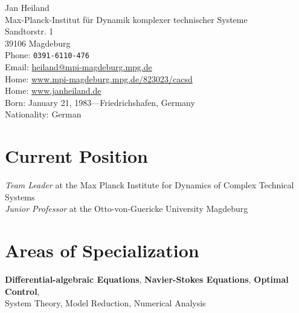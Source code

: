\documentclass[11pt, a4paper]{article} %
\begin{document}
\sffamily

{\LARGE Jan Heiland}\\[1cm] %
Max-Planck-Institut f\"ur Dynamik komplexer technischer Systeme\\ %
Sandtorstr. 1\\
39106 Magdeburg \\[.2cm]
Phone: \texttt{0391-6110-476}\\ [.2cm]
Email: \href{mailto:heiland@mpi-magdeburg.mpg.de}{heiland@mpi-magdeburg.mpg.de}\\ %
Home: \href{http://www.mpi-magdeburg.mpg.de/823023/cacsd}{www.mpi-magdeburg.mpg.de/823023/cacsd}\\ %
Home: \href{http://www.janheiland.de}{www.janheiland.de}\\[.3in] %



Born: January 21, 1983---Friedrichshafen, Germany\\ %
Nationality: German


\section*{Current Position}

\emph{Team Leader} at the Max Planck Institute for Dynamics of Complex Technical Systems \\ \emph{Junior Professor} at the Otto-von-Guericke University Magdeburg%


\section*{Areas of Specialization}

\textbf{Differential-algebraic Equations}, \textbf{Navier-Stokes Equations}, \textbf{Optimal Control},  \\System Theory, Model Reduction, Numerical Analysis
\end{document}
